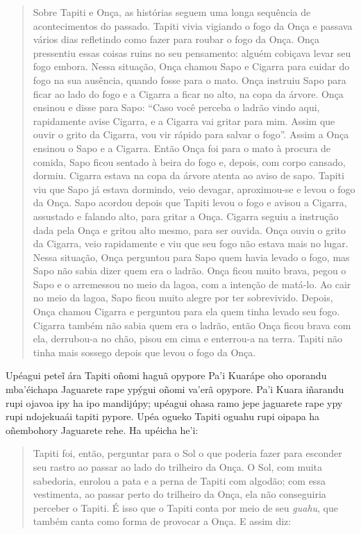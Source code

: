 \begin{itemize}
\begin{quote}
Sobre Tapiti e Onça, as histórias seguem uma longa sequência de
acontecimentos do passado. Tapiti vivia vigiando o fogo da Onça e
passava vários dias refletindo como fazer para roubar o fogo da Onça.
Onça pressentiu essas coisas ruins no seu pensamento: alguém cobiçava
levar seu fogo embora. Nessa situação, Onça chamou Sapo e Cigarra para
cuidar do fogo na sua ausência, quando fosse para o mato. Onça instruiu
Sapo para ficar ao lado do fogo e a Cigarra a ficar no alto, na copa da
árvore. Onça ensinou e disse para Sapo: ``Caso você perceba o ladrão
vindo aqui, rapidamente avise Cigarra, e a Cigarra vai gritar para mim.
Assim que ouvir o grito da Cigarra, vou vir rápido para salvar o fogo''.
Assim a Onça ensinou o Sapo e a Cigarra. Então Onça foi para o mato à
procura de comida, Sapo ficou sentado à beira do fogo e, depois, com
corpo cansado, dormiu. Cigarra estava na copa da árvore atenta ao aviso
de sapo. Tapiti viu que Sapo já estava dormindo, veio devagar,
aproximou-se e levou o fogo da Onça. Sapo acordou depois que Tapiti
levou o fogo e avisou a Cigarra, assustado e falando alto, para gritar a
Onça. Cigarra seguiu a instrução dada pela Onça e gritou alto mesmo,
para ser ouvida. Onça ouviu o grito da Cigarra, veio rapidamente e viu
que seu fogo não estava mais no lugar. Nessa situação, Onça perguntou
para Sapo quem havia levado o fogo, mas Sapo não sabia dizer quem era o
ladrão. Onça ficou muito brava, pegou o Sapo e o arremessou no meio da
lagoa, com a intenção de matá-lo. Ao cair no meio da lagoa, Sapo ficou
muito alegre por ter sobrevivido. Depois, Onça chamou Cigarra e
perguntou para ela quem tinha levado seu fogo. Cigarra também não sabia
quem era o ladrão, então Onça ficou brava com ela, derrubou-a no chão,
pisou em cima e enterrou-a na terra. Tapiti não tinha mais sossego
depois que levou o fogo da Onça.
\end{quote}

Upéagui peteĩ ára Tapiti oñomi haguã opypore Pa'i Kuarápe oho oporandu
mba'éichapa Jaguarete rape ypýgui oñomi va'erã opypore. Pa'i Kuara
iñarandu rupi ojavoa ipy ha ipo mandijúpy; upéagui ohasa ramo jepe
jaguarete rape ypy rupi ndojekuaái tapiti pypore. Upéa ogueko Tapiti
oguahu rupi oipapa ha oñembohory Jaguarete rehe. Ha upéicha he'i:

\begin{quote}
Tapiti foi, então, perguntar para o Sol o que poderia fazer para
esconder seu rastro ao passar ao lado do trilheiro da Onça. O Sol, com
muita sabedoria, enrolou a pata e a perna de Tapiti com algodão; com
essa vestimenta, ao passar perto do trilheiro da Onça, ela não
conseguiria perceber o Tapiti. É isso que o Tapiti conta por meio de seu
\emph{guahu}, que também canta como forma de provocar a Onça. E assim
diz:
\end{quote}


\end{itemize}
